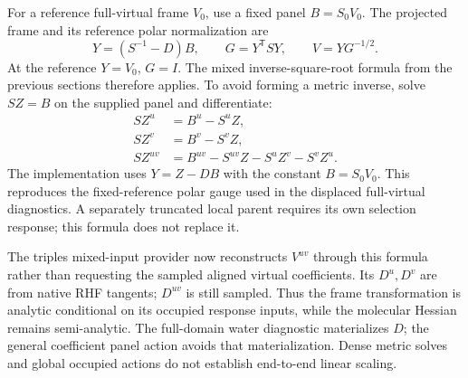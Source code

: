 \documentclass[11pt]{article}
\begin{document}
For a reference full-virtual frame $V_0$, use a fixed panel $B=S_0V_0$.
The projected frame and its reference polar normalization are
\begin{equation}
 Y=(S^{-1}-D)B,\qquad G=Y^{\mathsf T}S Y,\qquad V=Y G^{-1/2}.
\end{equation}
At the reference $Y=V_0$, $G=I$. The mixed inverse-square-root formula
from the previous sections therefore applies. To avoid forming a metric
inverse, solve $S Z=B$ on the supplied panel and differentiate:
\begin{align}
 S Z^u&=B^u-S^u Z,\\
 S Z^v&=B^v-S^v Z,\\
 S Z^{uv}&=B^{uv}-S^{uv}Z-S^u Z^v-S^v Z^u.
\end{align}
The implementation uses $Y=Z-DB$ with the constant $B=S_0V_0$.
This reproduces the fixed-reference polar gauge used in the displaced
full-virtual diagnostics. A separately truncated local parent requires
its own selection response; this formula does not replace it.

The triples mixed-input provider now reconstructs $V^{uv}$ through this
formula rather than requesting the sampled aligned virtual coefficients.
Its $D^u,D^v$ are from native RHF tangents; $D^{uv}$ is still sampled.
Thus the frame transformation is analytic conditional on its occupied
response inputs, while the molecular Hessian remains semi-analytic.
The full-domain water diagnostic materializes $D$; the general coefficient
panel action avoids that materialization. Dense metric solves and global
occupied actions do not establish end-to-end linear scaling.
\end{document}
